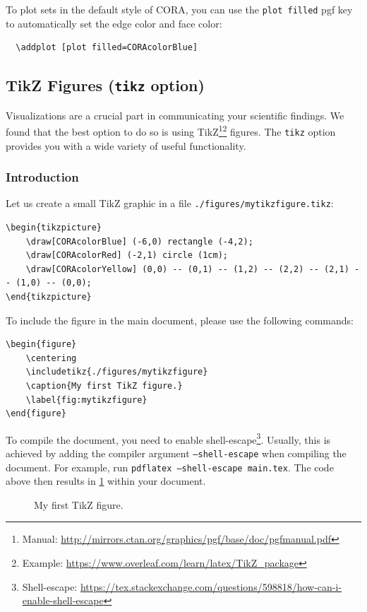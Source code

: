 \documentclass{article}
\begin{document}
To plot sets in the default style of CORA, you can use the \texttt{plot filled} pgf key to automatically set the edge color and face color:

\begin{verbatim}
  \addplot [plot filled=CORAcolorBlue]
\end{verbatim}

\subsection{TikZ Figures (\texttt{tikz} option)}\label{sec:tikz}

Visualizations are a crucial part in communicating your scientific findings.
We found that the best option to do so is using TikZ\footnote{Manual: \url{http://mirrors.ctan.org/graphics/pgf/base/doc/pgfmanual.pdf}}\footnote{Example: \url{https://www.overleaf.com/learn/latex/TikZ_package}} figures.
The \texttt{tikz} option provides you with a wide variety of useful functionality.

\subsubsection{Introduction}

Let us create a small TikZ graphic in a file \texttt{./figures/mytikzfigure.tikz}:

\begin{verbatim}
\begin{tikzpicture}
    \draw[CORAcolorBlue] (-6,0) rectangle (-4,2);
    \draw[CORAcolorRed] (-2,1) circle (1cm);
    \draw[CORAcolorYellow] (0,0) -- (0,1) -- (1,2) -- (2,2) -- (2,1) -- (1,0) -- (0,0);
\end{tikzpicture}
\end{verbatim}

To include the figure in the main document, please use the following commands:
\begin{verbatim}
\begin{figure}
    \centering
    \includetikz{./figures/mytikzfigure}
    \caption{My first TikZ figure.}
    \label{fig:mytikzfigure}
\end{figure}
\end{verbatim}

To compile the document, you need to enable shell-escape\footnote{Shell-escape: \url{https://tex.stackexchange.com/questions/598818/how-can-i-enable-shell-escape}}.
Usually, this is achieved by adding the compiler argument \texttt{--shell-escape} when compiling the document.
For example, run \texttt{pdflatex --shell-escape main.tex}.
The code above then results in \cref{fig:mytikzfigure} within your document.
\begin{figure}[h!]
  \centering
  \caption{My first TikZ figure.}
  \label{fig:mytikzfigure}
\end{figure}
\end{document}
